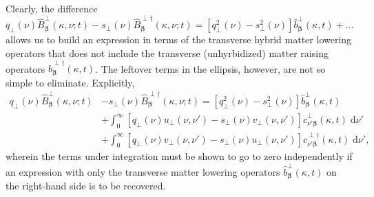 \documentclass{article}
\begin{document}
Clearly, the difference $q_\perp(\nu)\hat{B}_{\bm{\beta}}^\perp(\kappa,\nu;t) - s_\perp(\nu)\hat{B}_{\bm{\beta}}^{\perp\dagger}(\kappa,\nu;t) = [q_\perp^2(\nu) - s_\perp^2(\nu)]\hat{b}_{\bm{\beta}}^\perp(\kappa,t) + \ldots$ allows us to build an expression in terms of the transverse hybrid matter lowering operators that does not include the transverse (unhyrbidized) matter raising operators $\hat{b}_{\bm{\beta}}^{\perp\dagger}(\kappa,t)$. The leftover terms in the ellipsis, however, are not so simple to eliminate. Explicitly,
\begin{equation}
\begin{split}
q_\perp(\nu)\hat{B}_{\bm{\beta}}^\perp(\kappa,\nu;t) &- s_\perp(\nu)\hat{B}_{\bm{\beta}}^{\perp\dagger}(\kappa,\nu;t) = \left[q_\perp^2(\nu) - s_\perp^2(\nu)\right]\hat{b}_{\bm{\beta}}^\perp(\kappa,t)\\
&+ \int_0^\infty\left[q_\perp(\nu)u_\perp(\nu,\nu') - s_\perp(\nu)v_\perp(\nu,\nu')\right]\hat{c}_{\nu'\bm{\beta}}^\perp(\kappa,t)\;\mathrm{d}\nu'\\
&+ \int_0^\infty\left[q_\perp(\nu)v_\perp(\nu,\nu') - s_\perp(\nu)u_\perp(\nu,\nu')\right]\hat{c}_{\nu'\bm{\beta}}^{\perp\dagger}(\kappa,t)\;\mathrm{d}\nu',
\end{split}
\end{equation}
wherein the terms under integration must be shown to go to zero independently if an expression with only the transverse matter lowering operators $\hat{b}_{\bm{\beta}}^\perp(\kappa,t)$ on the right-hand side is to be recovered. 
\end{document}
